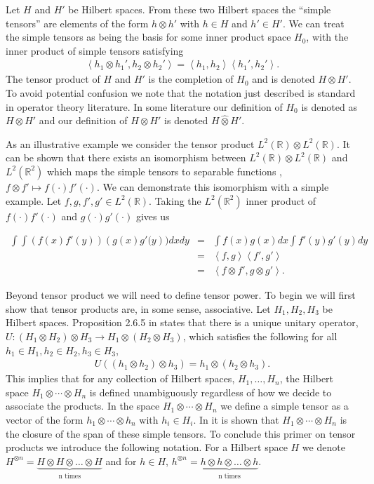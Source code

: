 \documentclass[aos]{imsart}
\def\rn{\mathbb{R}}
\def\l{\left}
\def\r{\right}
\theoremstyle{plain}
\theoremstyle{defintion}
\begin{document}
	Let $H$ and $H'$ be Hilbert spaces. From these two Hilbert spaces the ``simple tensors'' are elements of the form $h\otimes h'$ with $h\in H$ and $h' \in H'$. We can treat the simple tensors as being the basis for some inner product space $H_0$, with the inner product of simple tensors satisfying
	\begin{eqnarray*}
		\l<h_1 \otimes h_1', h_2 \otimes h_2'\r> = \l<h_1,h_2\r>\l<h_1',h_2'\r>.
	\end{eqnarray*}
	The tensor product of $H$ and $H'$ is the completion of $H_0$ and is denoted $H\otimes H'$. To avoid potential confusion we note that the notation just described is standard in operator theory literature. In some literature our definition of $H_0$ is denoted as $H\otimes H'$ and our definition of $H \otimes H'$ is denoted $H \widehat{\otimes} H'$.

	As an illustrative example we consider the tensor product $L^2\left( \rn \right) \otimes L^2\left( \rn \right)$. It can be shown that there exists an isomorphism between $L^2\left( \rn \right) \otimes L^2\left( \rn \right)$ and $L^2(\rn^2)$ which maps the simple tensors to separable functions \cite{kadison83}, $f \otimes f' \mapsto f(\cdot)f'(\cdot)$. We can demonstrate this isomorphism with a simple example. Let $f,g,f',g'\in L^2\left( \rn \right)$. Taking the $L^2(\rn^2)$ inner product of $f(\cdot)f'(\cdot)$ and $g(\cdot)g'(\cdot)$ gives us 

	\begin{eqnarray*}
		\int\int \l(f(x)f'(y)\r)\l(g(x)g'(y\r)) dx dy 
		&=& \int f(x)g(x) dx \int f'(y)g'(y) dy\\
	 &=& \l<f,g\r>  \l<f',g'\r>\\
	 &=& \l<f\otimes f', g \otimes g'\r>.
	\end{eqnarray*}

	Beyond tensor product we will need to define tensor power. To begin we will first show that tensor products are, in some sense, associative. Let $H_1, H_2, H_3$ be Hilbert spaces. Proposition 2.6.5 in \cite{kadison83} states that there is a unique unitary operator, $U: (H_1 \otimes H_2)\otimes H_3 \to H_1 \otimes (H_2 \otimes H_3)$, which satisfies the following for all $h_1 \in H_1, h_2 \in H_2, h_3 \in H_3$,
	\begin{eqnarray*}
		U\left( \left( h_1 \otimes h_2 \right)\otimes h_3 \right) = h_1 \otimes \left( h_2 \otimes h_3 \right).
	\end{eqnarray*}
	This implies that for any collection of Hilbert spaces, $H_1,\ldots , H_n$, the Hilbert space $H_1 \otimes \cdots \otimes H_n$ is defined unambiguously regardless of how we decide to associate the products. In the space $H_1 \otimes \cdots \otimes H_n$ we define a simple tensor as a vector of the form $h_1 \otimes\cdots\otimes h_n$ with $h_i \in H_i$. In \cite{kadison83} it is shown that $H_1 \otimes\cdots \otimes H_n$ is the closure of the span of these simple tensors. To conclude this primer on tensor products we introduce the following notation. For a Hilbert space $H$ we denote $H^{\otimes n}= \underbrace{H\otimes H \otimes \dots \otimes H}_\text{n times}$ and for $h \in H$, $h^{\otimes n}= \underbrace{h\otimes h \otimes \dots \otimes h}_\text{n times}$.
\end{document}
